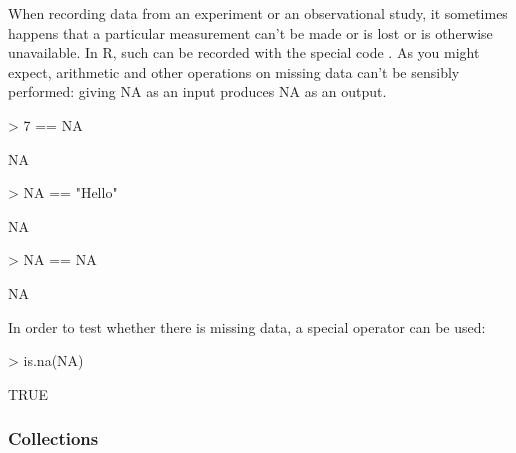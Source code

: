 When recording data from an experiment or an observational study, it
sometimes happens that a particular measurement can't be made or is
lost or is otherwise unavailable.  In R, such 
can be recorded with the special code .  As you might expect,
arithmetic and other operations on missing data can't be sensibly
performed: giving NA as an input produces NA as an output.
\begin{Schunk}
\begin{Sinput}
> 7 == NA
\end{Sinput}
\begin{Soutput}
[1] NA
\end{Soutput}
\begin{Sinput}
> NA == "Hello"
\end{Sinput}
\begin{Soutput}
[1] NA
\end{Soutput}
\begin{Sinput}
> NA == NA
\end{Sinput}
\begin{Soutput}
[1] NA
\end{Soutput}
\end{Schunk}


In order to test whether there is missing data, a special operator
 can be used:
\begin{Schunk}
\begin{Sinput}
> is.na(NA)
\end{Sinput}
\begin{Soutput}
[1] TRUE
\end{Soutput}
\end{Schunk}

\subsubsection{Collections}


